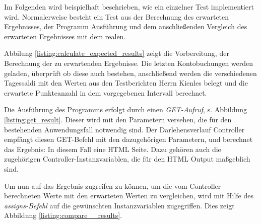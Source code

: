 \documentclass[12pt,             %
               a4paper,          %
               listof=totoc,     %
               index=totoc,      %
               bibliography=totoc,%
               oneside,         %
               BCOR1cm,          %
               english   %
               ]{scrbook}
\begin{document}
Im Folgenden wird beispielhaft beschrieben, wie ein einzelner Test implementiert wird. Normalerweise besteht ein Test aus der Berechnung des erwarteten Ergebnisses, der Programm Ausführung und dem anschließenden Vergleich des erwarteten Ergebnisses mit dem realen. 

Abbilung \vref{listing:calculate_expected_results} zeigt die Vorbereitung, der Berechnung der zu erwartenden Ergebnisse. Die letzten Kontobuchungen werden geladen, überprüft ob diese auch bestehen, anschließend werden die verschiedenen Tagessaldi mit den Werten aus den Testberichten Herrn Kienles belegt und die erwartete Punkteanzahl in dem vorgegebenen Intervall berechnet.\\

\label{listing:calculate_expected_results}

Die Ausführung des Programms erfolgt durch einen \textit{GET-Aufruf}, s. Abbildung \vref{listing:get_result}. Dieser wird mit den Parametern versehen, die für den bestehenden Anwendungsfall notwendig sind. Der Darlehensverlauf Controller empfängt diesen GET-Befehl mit den dazugehörigen Parametern, und berechnet das Ergebnis: In diesem Fall eine HTML Seite. Dazu gehören auch die zugehörigen Controller-Instanzvariablen, die für den HTML Output maßgeblich sind.\\

\label{listing:get_result}

Um nun auf das Ergebnis zugreifen zu können, um die vom Controller berechneten Werte mit den erwarteten Werten zu vergleichen, wird mit Hilfe des \textit{assigns-Befehl} auf die gewünschten Instanzvariablen zugegriffen. Dies zeigt Abbildung \vref{listing:compare__results}.\\

\label{listing:compare__results}

\end{document}
